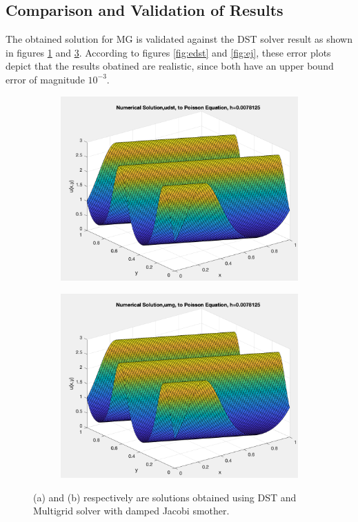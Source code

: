 \documentclass[12pt,a4paper]{article}
\begin{document}
	\newpage
	\subsection{Comparison and Validation of Results}
	The obtained solution for MG is validated against the DST solver result as shown in figures \ref{fig:dstsoln} and \ref{fig:ujsoln}. According to  figures \ref{fig:edst} and \ref{fig:ej}, these error plots  depict that the results obatined are realistic, since both have an upper bound error of magnitude $10^{-3}$.\\ 
	
	\begin{figure}[H]
		\begin{subfigure}[b]{0.5\textwidth}
			\centering
			\includegraphics[width=1.0\linewidth]{"udst"}
			\caption{}
			\label{fig:dstsoln}
		\end{subfigure}
		\begin{subfigure}[b]{0.5\textwidth}
			\centering
			\includegraphics[width=1.0\linewidth]{"uj"}
			\caption{}
			\label{fig:ujsoln}
		\end{subfigure}
		\caption{(a) and (b) respectively are solutions obtained using DST and Multigrid solver with damped Jacobi smother. }
	\end{figure}
	
\end{document}
